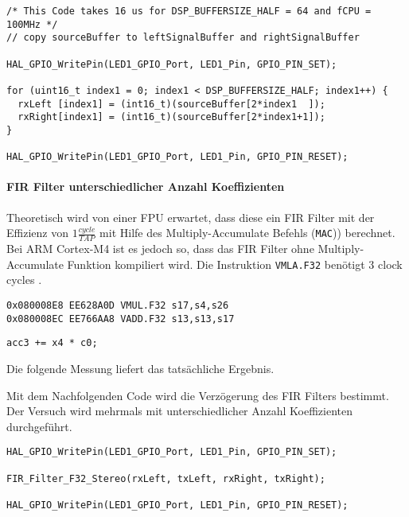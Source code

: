 \begin{lstlisting}[style=Cuvision, caption={GPIO togglen um die Kopierzeit zu messen}]
/* This Code takes 16 us for DSP_BUFFERSIZE_HALF = 64 and fCPU = 100MHz */
// copy sourceBuffer to leftSignalBuffer and rightSignalBuffer

HAL_GPIO_WritePin(LED1_GPIO_Port, LED1_Pin, GPIO_PIN_SET);

for (uint16_t index1 = 0; index1 < DSP_BUFFERSIZE_HALF; index1++) {
  rxLeft [index1] = (int16_t)(sourceBuffer[2*index1  ]);  
  rxRight[index1] = (int16_t)(sourceBuffer[2*index1+1]); 
}

HAL_GPIO_WritePin(LED1_GPIO_Port, LED1_Pin, GPIO_PIN_RESET);
\end{lstlisting}


\paragraph{FIR Filter unterschiedlicher Anzahl Koeffizienten}

Theoretisch wird von einer FPU erwartet, dass diese ein FIR Filter mit der Effizienz von $1\frac{cycle}{TAP}$ mit Hilfe des Multiply-Accumulate Befehls (\texttt{MAC})) berechnet.
Bei ARM Cortex-M4 ist es jedoch so, dass das FIR Filter ohne Multiply-Accumulate Funktion kompiliert wird. Die Instruktion \texttt{VMLA.F32} benötigt 3 clock cycles \cite{ARM-M4-FPU-reference}. 

\begin{lstlisting}[style=Cuvision,caption={Kompilierte Multiply-Accumulate Instruktion}]
0x080008E8 EE628A0D VMUL.F32 s17,s4,s26
0x080008EC EE766AA8 VADD.F32 s13,s13,s17
\end{lstlisting}

\begin{lstlisting}[style=Cuvision,caption={Multiply-Accumulate Befehl in C aus der CMSIS/DSP Library \texttt{arm\_fir\_f32.c}}, firstnumber=465]
    acc3 += x4 * c0;
\end{lstlisting}

Die folgende Messung liefert das tatsächliche Ergebnis.

Mit dem Nachfolgenden Code wird die Verzögerung des FIR Filters bestimmt.
Der Versuch wird mehrmals mit unterschiedlicher Anzahl Koeffizienten durchgeführt.

\begin{lstlisting}[style=Cuvision,caption={GPIO togglen um FIR Verarbeitungszeit zu messen}]
HAL_GPIO_WritePin(LED1_GPIO_Port, LED1_Pin, GPIO_PIN_SET);

FIR_Filter_F32_Stereo(rxLeft, txLeft, rxRight, txRight);

HAL_GPIO_WritePin(LED1_GPIO_Port, LED1_Pin, GPIO_PIN_RESET);
\end{lstlisting}



